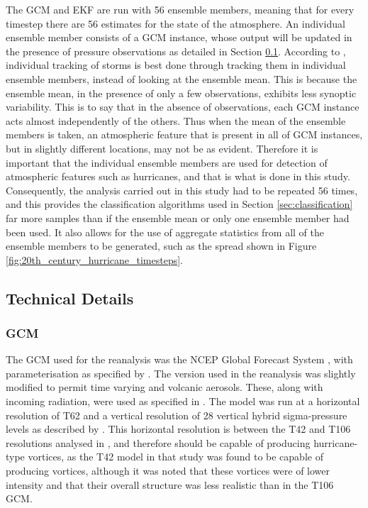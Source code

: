 \documentclass[pdftex,12pt,a4paper]{report}
\begin{document}
The GCM and EKF are run with 56 ensemble members, meaning that for every timestep there are 56
estimates for the state of the atmosphere. An individual ensemble member consists of a GCM instance,
whose output will be updated in the presence of pressure observations as detailed in Section
\ref{sec:technical_details}. According to \textcite{compoTwentieth2011}, individual tracking of
storms is best done through tracking them in individual ensemble members, instead of looking at the
ensemble mean. This is because the ensemble mean, in the presence of only a few observations,
exhibits less synoptic variability. This is to say that in the absence of observations, each GCM
instance acts almost independently of the others. Thus when the mean of the ensemble members is
taken, an atmospheric feature that is present in all of GCM instances, but in slightly different
locations, may not be as evident. Therefore it is important that the individual ensemble members are
used for detection of atmospheric features such as hurricanes, and that is what is done in this
study. Consequently, the analysis carried out in this study had to be repeated 56 times, and this
provides the classification algorithms used in Section \ref{sec:classification} far more samples
than if the ensemble mean or only one ensemble member had been used. It also allows for the use of
aggregate statistics from all of the ensemble members to be generated, such as the spread shown in
Figure \ref{fig:20th_century_hurricane_timesteps}.

\subsection{Technical Details}
\label{sec:technical_details}

\subsubsection{GCM}
The GCM used for the reanalysis was the NCEP Global Forecast System
\parencite{kanamitsu1989description, kanamitsu1991recent}, with
parameterisation as specified by \textcite{saha2006ncep}. The version used in the reanalysis was
slightly modified to permit time varying  and volcanic aerosols. These, along with incoming
radiation, were used as specified in \textcite{saha2010ncep}. The model was run at a horizontal
resolution of T62 and a vertical resolution of 28 vertical hybrid sigma-pressure levels as described
by \textcite{juang2005discrete}. This horizontal resolution is between the T42 and T106 resolutions
analysed in \textcite{bengtsson1995hurricane}, and therefore should be capable of producing
hurricane-type vortices, as the T42 model in that study was found to be capable of producing
vortices, although it was noted that these vortices were of lower intensity and that their overall
structure was less realistic than in the T106 GCM.
\end{document}
